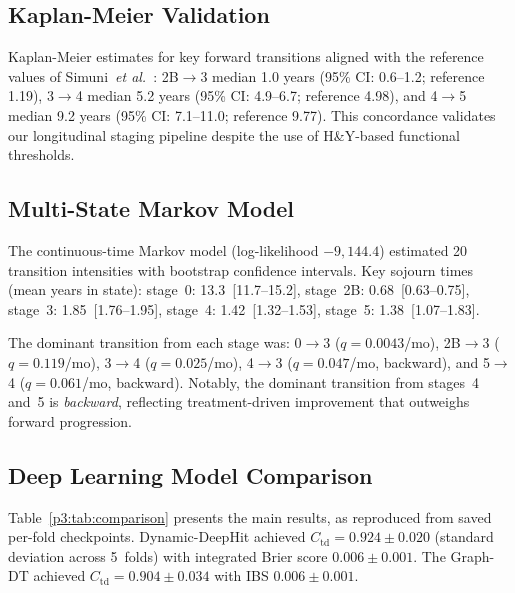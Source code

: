 \subsection{Kaplan-Meier Validation}

Kaplan-Meier estimates for key forward transitions aligned with the reference values of Simuni~\textit{et al.}~\cite{simuni2025}: 2B$\to$3 median 1.0 years (95\% CI: 0.6--1.2; reference 1.19), 3$\to$4 median 5.2 years (95\% CI: 4.9--6.7; reference 4.98), and 4$\to$5 median 9.2 years (95\% CI: 7.1--11.0; reference 9.77). This concordance validates our longitudinal staging pipeline despite the use of H\&Y-based functional thresholds.

\subsection{Multi-State Markov Model}

The continuous-time Markov model (log-likelihood $-9{,}144.4$) estimated 20 transition intensities with bootstrap confidence intervals. Key sojourn times (mean years in state): stage~0: 13.3~[11.7--15.2], stage~2B: 0.68~[0.63--0.75], stage~3: 1.85~[1.76--1.95], stage~4: 1.42~[1.32--1.53], stage~5: 1.38~[1.07--1.83].

The dominant transition from each stage was: 0$\to$3 ($q{=}0.0043$/mo), 2B$\to$3 ($q{=}0.119$/mo), 3$\to$4 ($q{=}0.025$/mo), 4$\to$3 ($q{=}0.047$/mo, backward), and 5$\to$4 ($q{=}0.061$/mo, backward). Notably, the dominant transition from stages~4 and~5 is \textit{backward}, reflecting treatment-driven improvement that outweighs forward progression.

\subsection{Deep Learning Model Comparison}

Table~\ref{p3:tab:comparison} presents the main results, as reproduced from saved per-fold checkpoints. Dynamic-DeepHit achieved $C_\text{td} = 0.924 \pm 0.020$ (standard deviation across 5~folds) with integrated Brier score $0.006 \pm 0.001$. The Graph-DT achieved $C_\text{td} = 0.904 \pm 0.034$ with IBS $0.006 \pm 0.001$.


